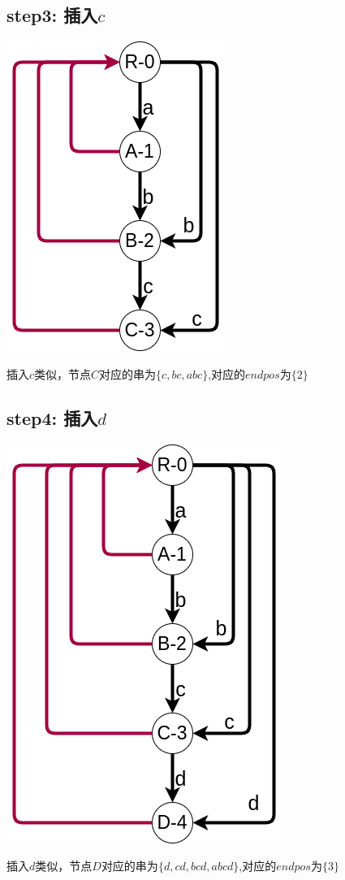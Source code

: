 \documentclass{article}
\begin{document}
\subsection{step3: 插入$c$}
\includegraphics[scale=0.5]{step3.png} \par
插入$c$类似，节点$C$对应的串为$\{c,bc,abc\}$,对应的$endpos$为$\{2\}$ \par
\subsection{step4: 插入$d$}
\includegraphics[scale=0.5]{step4.png} \par
插入$d$类似，节点$D$对应的串为$\{d,cd,bcd,abcd\}$,对应的$endpos$为$\{3\}$ \par
\end{document}
